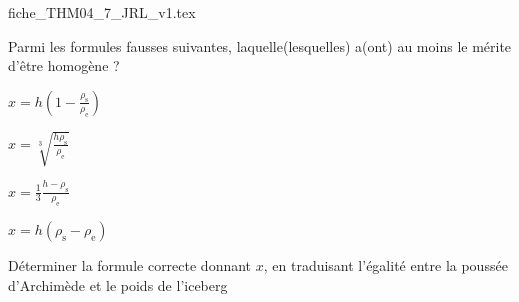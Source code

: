                                 \initialisationPartieDroite %
\begin{center}
{fiche_THM04_7_JRL_v1.tex}
\end{center}
                               \finalisationDuPartageDePage %

\debutEntrainement


\begin{enonce}
Parmi les formules fausses suivantes, laquelle(lesquelles) a(ont) au moins le mérite d'être homogène ?
\begin{listeQCM2Colonnes}
	\item $x=h\left(1-\frac{\rho_\text{s}}{\rho_\text{e}}\right)$
	\item $x=\sqrt[3]{\frac{h\rho_\text{s}}{\rho_\text{e}}}$
	\item $x=\frac13 \frac{h-\rho_\text{s}}{\rho_\text{e}}$
	\item $x=h\left(\rho_\text{s}-\rho_\text{e}\right)$
	\end{listeQCM2Colonnes}
\end{enonce}

\reponse{\reponseA}


\begin{enonce}
Déterminer la formule correcte donnant $x$, en traduisant l'égalité entre la poussée d'Archimède et le poids de l'iceberg
\end{enonce}


